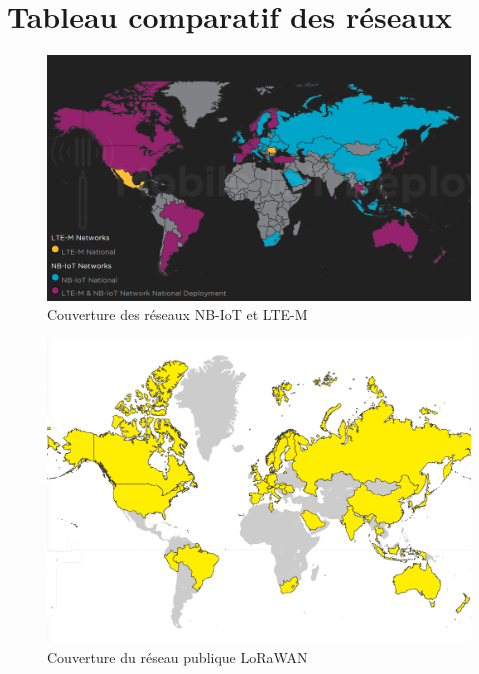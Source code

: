 \appendix

\chapter{Tableau comparatif des réseaux}
\label{ap:table_network}


\begin{figure}[h!]
  \includegraphics[width=\textwidth]{img/state_of_the_art/cov_iot_net.png}
  \caption{Couverture des réseaux NB-IoT et LTE-M \cite{iot_map}}
  \label{fig:cov_iot_map}
\end{figure}

\begin{figure}[h!]
  \centering
  \includegraphics[scale=0.5]{img/state_of_the_art/lora_cov_pub.png}
  \caption{Couverture du réseau publique LoRaWAN \cite{lora_map}}
  \label{fig:cov_lorapub_map}
\end{figure}



